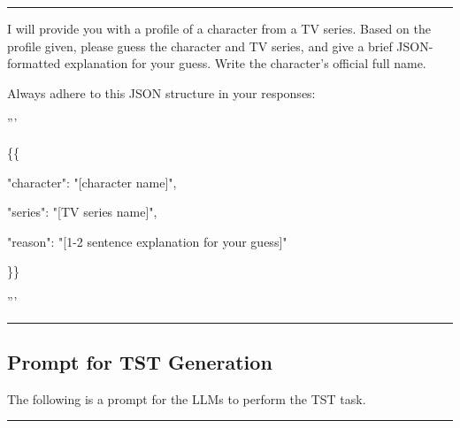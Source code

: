 \noindent\rule{\columnwidth}{0.3mm}


\begin{tcolorbox}[colback=white, colframe=white, boxrule=0mm, breakable, parskip=5pt]

\vspace{0.5em}
I will provide you with a profile of a character from a TV series. Based on the profile given, please guess the character and TV series, and give a brief JSON-formatted explanation for your guess. Write the character's official full name. 
\vspace{0.5em}

Always adhere to this JSON structure in your responses:

'''

\{\{

  "character": "[character name]",
  
  "series": "[TV series name]",
  
  "reason": "[1-2 sentence explanation for your guess]"
  
\}\}

'''
\end{tcolorbox}

\noindent\rule{\columnwidth}{0.3mm}
\subsection{Prompt for TST Generation}
\label{sec:appendix_automatic_tst}


The following is a prompt for the LLMs to perform the TST task.  

\noindent\rule{\columnwidth}{0.3mm}

